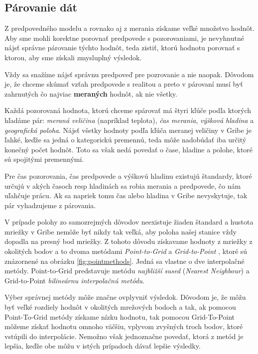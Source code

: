 \subsection{Párovanie dát}
\label{subsec:pairing}
Z predpovedného modelu a rovnako aj z merania získame veľké množstvo hodnôt. Aby sme mohli korektne porovnať predpovede s pozorovaniami, je nevyhnutné nájsť správne párovanie týchto hodnôt, teda zistiť, ktorú hodnotu porovnať s ktorou, aby sme získali zmysluplný výsledok.

Vždy sa snažíme nájsť správnu predpoveď pre pozrovanie a nie naopak.
Dôvodom je, že chceme skúmať vzťah predpovede s realitou a preto v párovaní musí byť zahrnutých čo najviac \textbf{meraných} hodnôt, ak nie všetky.

Každá pozorovaná hodnota, ktorú chceme spárovať má štyri kľúče podľa ktorých hľadáme pár: \textit{meraná veličina} (napríklad teplota), \textit{čas merania}, \textit{výšková hladina} a \textit{geografická poloha}.
Nájsť všetky hodnoty podľa kľúča meranej veličiny v Gribe je ľahké, keďže sa jedná o kategorickú premennú, teda môže nadobúdať iba určitý konečný počet hodnôt. Toto sa však nedá povedať o čase, hladine a polohe, ktoré sú spojitými premennými.
 
Pre čas pozorovania, čas predpovede a výškovú hladinu existujú štandardy, ktoré určujú v akých časoch resp hladinách sa robia merania a predpovede, čo nám uľahčuje prácu. Ak sa napriek tomu čas alebo hladina v Gribe nevyskytuje, tak pár vyhadzujeme z párovania. 

V prípade polohy zo samozrejmých dôvodov neexistuje žiaden štandard a hustota mriežky v Gribe nemôže byť nikdy tak veľká, aby poloha našej stanice vždy dopadla na presný bod mriežky. Z tohoto dôvodu získavame hodnoty z mriežky z okolitých bodov a to dvoma metódami \textit{Point-to-Grid} a \textit{Grid-to-Point} \cite{IntroToVerif}, ktoré sú znázornené na obrázku \ref{fig:pointmethods}. Jedná sa vlastne o dve interpolačné metódy. Point-to-Grid predstavuje metódu \textit{najbližší sused} (\textit{Nearest Neighbour}) a Grid-to-Point \textit{bilineárnu interpolačnú metódu}. 

Výber správnej metódy môže značne ovplyvniť výsledok. Dôvodom je, že môžu byť veľké rozdiely hodnôt v okolitých mrežových bodoch a tak, ak pomocou Point-To-Grid metódy získame nízku hodnotu, tak pomocou Grid-To-Point môžeme získať hodnotu omnoho väčšiu, vplyvom zvyšných troch bodov, ktoré vstúpili do interpolácie. Nemožno však jednoznačne povedať, ktorá z metód je lepšia, keďže obe môžu v istých prípadoch dávať lepšie výsledky. 

